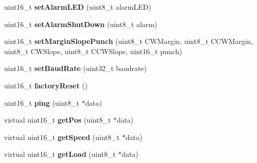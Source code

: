 \begin{DoxyCompactItemize}
\item 
uint16\+\_\+t {\bfseries set\+Alarm\+L\+ED} (uint8\+\_\+t alarm\+L\+ED)\hypertarget{classCytron__G15__Servo_aba44b1c07734438c134c15d749600dc8}{}\label{classCytron__G15__Servo_aba44b1c07734438c134c15d749600dc8}

\item 
uint16\+\_\+t {\bfseries set\+Alarm\+Shut\+Down} (uint8\+\_\+t alarm)\hypertarget{classCytron__G15__Servo_aca836247a264b78190d66d08afa9c25c}{}\label{classCytron__G15__Servo_aca836247a264b78190d66d08afa9c25c}

\item 
uint16\+\_\+t {\bfseries set\+Margin\+Slope\+Punch} (uint8\+\_\+t C\+W\+Margin, uint8\+\_\+t C\+C\+W\+Margin, uint8\+\_\+t C\+W\+Slope, uint8\+\_\+t C\+C\+W\+Slope, uint16\+\_\+t punch)\hypertarget{classCytron__G15__Servo_a1573aab50488f1c6fc8f60fda743588d}{}\label{classCytron__G15__Servo_a1573aab50488f1c6fc8f60fda743588d}

\item 
uint16\+\_\+t {\bfseries set\+Baud\+Rate} (uint32\+\_\+t baudrate)\hypertarget{classCytron__G15__Servo_a6e1bf5fb5fe1a8a394a635930f7baaeb}{}\label{classCytron__G15__Servo_a6e1bf5fb5fe1a8a394a635930f7baaeb}

\item 
uint16\+\_\+t {\bfseries factory\+Reset} ()\hypertarget{classCytron__G15__Servo_a337497c9ac0f8048e89cd5a10046fe16}{}\label{classCytron__G15__Servo_a337497c9ac0f8048e89cd5a10046fe16}

\item 
uint16\+\_\+t {\bfseries ping} (uint8\+\_\+t $\ast$data)\hypertarget{classCytron__G15__Servo_a1f040caa0df97184da83bc3586495fd8}{}\label{classCytron__G15__Servo_a1f040caa0df97184da83bc3586495fd8}

\item 
virtual uint16\+\_\+t {\bfseries get\+Pos} (uint8\+\_\+t $\ast$data)\hypertarget{classCytron__G15__Servo_aa36275b14ba285e655c05324742189d4}{}\label{classCytron__G15__Servo_aa36275b14ba285e655c05324742189d4}

\item 
virtual uint16\+\_\+t {\bfseries get\+Speed} (uint8\+\_\+t $\ast$data)\hypertarget{classCytron__G15__Servo_a831b8c81e9f454cb501bd37a236acd1c}{}\label{classCytron__G15__Servo_a831b8c81e9f454cb501bd37a236acd1c}

\item 
virtual uint16\+\_\+t {\bfseries get\+Load} (uint8\+\_\+t $\ast$data)\hypertarget{classCytron__G15__Servo_a1c4d4e66b578f100bfb92ba1494f56f4}{}\label{classCytron__G15__Servo_a1c4d4e66b578f100bfb92ba1494f56f4}


\end{DoxyCompactItemize}
